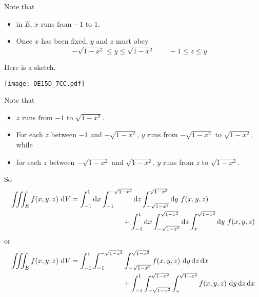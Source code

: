 \begin{solution}
Note that
\begin{itemize}
\item
  in $E$, $x$ runs from $-1$ to $1$.
\item 
  Once $x$ has been fixed, $y$ and $z$ must obey
   \begin{equation*}
       -\sqrt{1-x^2}\le y\le\sqrt{1-x^2}\qquad -1\le z\le y 
   \end{equation*}
\end{itemize}
Here is a sketch.
\begin{center}
\texttt{[image: OE15D\_7CC.pdf]}
\end{center}
Note that
\begin{itemize}
\item
    $z$ runs from $-1$ to  $\sqrt{1-x^2}$.
\item
    For each $z$ between $-1$ and $-\sqrt{1-x^2}$, $y$ runs from 
    $-\sqrt{1-x^2}$ to $\sqrt{1-x^2}$, while
\item
    for each $z$ between $-\sqrt{1-x^2}$ and $\sqrt{1-x^2}$, $y$ runs from 
    $z$ to $\sqrt{1-x^2}$.
\end{itemize}
So 
\begin{align*}
\tripInt_E f(x,y,z)\ \dee{V}
&=\int_{-1}^1\dee{x} \int_{-1}^{-\sqrt{1-x^2}}\dee{z}  
                     \int_{-\sqrt{1-x^2}}^{\sqrt{1-x^2}}\dee{y}  \ f(x,y,z) \\
&\hskip1in  +\int_{-1}^1\dee{x} \int_{-\sqrt{1-x^2}}^{\sqrt{1-x^2}}\dee{z}  
                    \int_z^{\sqrt{1-x^2}}\dee{y}  \ f(x,y,z) 
\end{align*}
or
\begin{align*}
\tripInt_E f(x,y,z)\ \dee{V}
&=\int_{-1}^1 \int_{-1}^{-\sqrt{1-x^2}} \int_{-\sqrt{1-x^2}}^{\sqrt{1-x^2}}
              f(x,y,z)\ \dee{y}\,\dee{z}\,\dee{x} \\
&\hskip1in  +\int_{-1}^1 \int_{-\sqrt{1-x^2}}^{\sqrt{1-x^2}}
                    \int_z^{\sqrt{1-x^2}}  f(x,y,z)\ \dee{y}\,\dee{z}\,\dee{x} 
\end{align*}
\end{solution}


